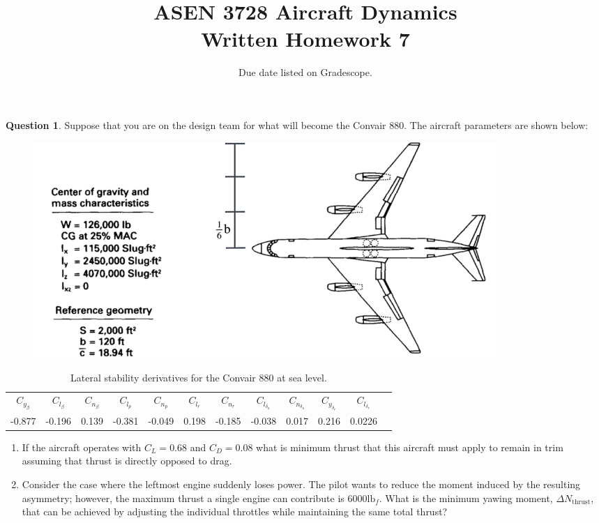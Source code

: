 \documentclass{article}
\title{ASEN 3728 Aircraft Dynamics\\Written Homework 7}
\date{Due date listed on Gradescope.}
\theoremstyle{definition}
\newtheorem{question}{Question}
\begin{document}
\maketitle

\begin{question}
    Suppose that you are on the design team for what will become the Convair 880. The aircraft parameters are shown below:
\begin{figure}[htbp]
    \centering
    \includegraphics[width=0.85\textwidth]{convair880.jpg}
\end{figure}
\begin{table}[htbp]
    \centering
    \caption{Lateral stability derivatives for the Convair 880 at sea level.}
    \begin{tabular}{cccccccccccc} %
        \toprule
$C_{y_\beta}$ & $C_{l_\beta}$ & $C_{n_\beta}$ & $C_{l_p}$ & $C_{n_p}$ & $C_{l_r}$ & $C_{n_r}$ & $C_{l_{\delta_a}}$ & $C_{n_{\delta_a}}$ & $C_{y_{\delta_r}}$ & $C_{l_{\delta_r}}$ \\ %
-0.877 & -0.196 & 0.139 & -0.381 & -0.049 & 0.198 & -0.185 & -0.038 & 0.017 & 0.216 & 0.0226 \\ %
    \bottomrule
    \end{tabular}
\end{table}

\begin{enumerate}[label=\alph*)]
    \item If the aircraft operates with $C_L = 0.68$ and $C_D = 0.08$ what is minimum thrust that this aircraft must apply to remain in trim assuming that thrust is directly opposed to drag.
    
    \item Consider the case where the leftmost engine suddenly loses power. The pilot wants to reduce the moment induced by the resulting asymmetry; however, the maximum thrust a single engine can contribute is $6000 \text{lb}_f$. What is the minimum yawing moment, $\Delta N_\text{thrust}$, that can be achieved by adjusting the individual throttles while maintaining the same total thrust? 


\end{enumerate}
\end{question}
\end{document}
